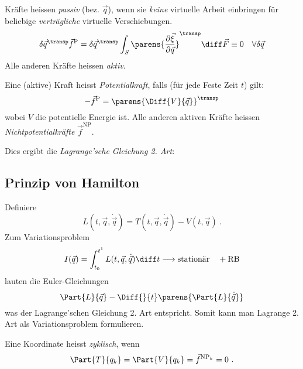 		\begin{definition}
			Kräfte heissen \emph{passiv} (bez. $\vec q$), wenn sie \emph{keine} virtuelle Arbeit einbringen für beliebige \emph{verträgliche} virtuelle Verschiebungen.
			\[
				\delta \vec q^\transp \vec f^\text{P} = \delta \vec q^\transp \int_S \parens{
					\frac{\partial \vec \xi}{\partial \vec q} 
				}^\transp \diff \vec F \equiv 0 \quad \forall \delta\vec q
			\]
			Alle anderen Kräfte heissen \emph{aktiv}.
		\end{definition}
		
		\begin{definition}
			Eine (aktive) Kraft heisst \emph{Potentialkraft}, falls (für jede Feste Zeit $t$) gilt:
			\[
				- \vec f^\text{P} = \parens{\Diff{V}{\vec q}}^\transp
			\]
			wobei $V$ die potentielle Energie ist. Alle anderen aktiven Kräfte heissen \emph{Nichtpotentialkräfte} $\vec f^\text{NP}$.
		\end{definition}
		
		Dies ergibt die \emph{Lagrange'sche Gleichung 2. Art}:
	
	\subsection{Prinzip von Hamilton} %
		Definiere
		\[
			L(t,\vec q, \dot{\vec q}) = T(t,\vec q, \dot{\vec q}) - V(t,\vec q) \ .
		\]
		Zum Variationsproblem
		\[
			I(\vec q) = \int_{t_0}^{t^1} L(t,\vec q, \dot{\vec q}) \diff t \longrightarrow \text{stationär} \quad + \text{RB}
		\]
		lauten die Euler-Gleichungen
		\[
			\Part{L}{\vec q} - \Diff{}{t}\parens{\Part{L}{\dot{\vec q}}}
		\]
		was der Lagrange'schen Gleichung 2. Art entspricht. Somit kann man Lagrange 2. Art als Variationsproblem formulieren.
		
		\begin{definition}
			Eine Koordinate heisst \emph{zyklisch}, wenn
			\[
				\Part{T}{q_k} = \Part{V}{q_k} = \vec f^{\text{NP}_k} = 0 \ .
			\]
		\end{definition}
	
